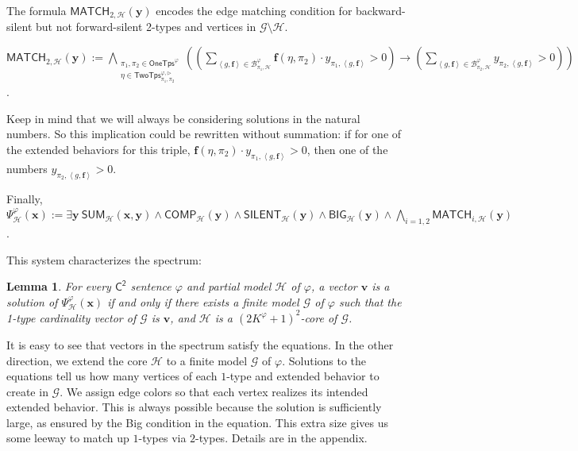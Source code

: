 \documentclass[10pt,a4paper]{article}
\newtheorem{lemma}[theorem]{Lemma}
\theoremstyle{definition}
\theoremstyle{remark}
\newcommand{\cB}{\mathcal{B}}
\newcommand{\cG}{\mathcal{G}}
\newcommand{\cH}{\mathcal{H}}
\newcommand{\cK}{\mathsf{TwoTps}}
\newcommand{\bff}{\mathbf{f}}
\newcommand{\bfv}{\mathbf{v}}
\newcommand{\bfx}{\mathbf{x}}
\newcommand{\bfy}{\mathbf{y}}
\newcommand{\Ctwo}    {\mathsf{C^2}}
\newcommand{\onetypes}{\mathsf{OneTps}}
\newcommand{\tuple}[1]       {\left\langle #1 \right\rangle}
\newcommand{\trif} {\triangleright}
\newcommand{\cKvpf}     {\cK^{\varphi, \trif}}
\newcommand{\summ}  {\mathsf{SUM}}
\newcommand{\comp}  {\mathsf{COMP}}
\newcommand{\silent}  {\mathsf{SILENT}}
\newcommand{\bige}  {\mathsf{BIG}}
\newcommand{\match} {\mathsf{MATCH}}
\begin{document}
\begin{compactitem}
    \item
        The formula $\match_{2, \cH}(\bfy)$ encodes the edge matching condition for backward-silent but not forward-silent 2-types and vertices in $\cG \setminus \cH$. \\
        \begin{notsotiny}
        $\displaystyle
        \match_{2, \cH}(\bfy)
         := 
        \bigwedge_{\substack{
            \pi_1, \pi_2 \in \onetypes^\varphi \\
            \eta \in \cKvpf_{\pi_1, \pi_2}}}
        \left(
            \left(
                \sum_{\tuple{g, \bff} \in \cB^{\varphi}_{\pi_1, \cH}} \bff(\eta, \pi_2) \cdot y_{\pi_1, \tuple{g, \bff}} > 0
            \right)
            \to
            \left(
                \sum_{\tuple{g, \bff} \in \cB^{\varphi}_{\pi_2, \cH}} y_{\pi_2, \tuple{g, \bff}} > 0
            \right)
        \right)
        $.
        \end{notsotiny}
        Keep in mind that we will always be considering solutions in the natural numbers. So this implication could be rewritten without summation: if for one of the extended behaviors for this triple, $\bff(\eta, \pi_2) \cdot y_{\pi_1, \tuple{g, \bff}} > 0$, then  one of the numbers $y_{\pi_2, \tuple{g, \bff}} > 0$.
\end{compactitem}
Finally, $\displaystyle
    \Psi^\varphi_{\cH}(\bfx)
         :=
         \exists \bfy\ 
        \summ_{\cH}(\bfx, \bfy) \land
        \comp_{\cH}(\bfy) \land
        \silent_{\cH}(\bfy) \land
        \bige_{\cH}(\bfy) \land
        \bigwedge_{i=1, 2}
        \match_{i, \cH}(\bfy)$.

This system characterizes the spectrum:
\begin{lemma}\label{lem:c2_spec_core}
    For every $\Ctwo$ sentence $\varphi$ and partial model $\cH$ of $\varphi$,
    a vector $\bfv$ is a solution of $\Psi^\varphi_\cH(\bfx)$
    if and only if
    there exists a finite model $\cG$ of $\varphi$ such that
    the 1-type cardinality vector of $\cG$ is $\bfv$,
    and $\cH$ is a $(2K^\varphi+1)^2$-core of $\cG$.
\end{lemma}

It is easy to see that vectors in the spectrum satisfy the equations. 
In the other direction, we extend the core $\cH$ to a finite model $\cG$ of $\varphi$.
Solutions to the equations tell us how many vertices of each $1$-type and extended behavior to create in $\cG$.
We assign edge colors so that each vertex realizes its intended extended behavior.
This is always possible because the solution is sufficiently large, as ensured by the Big condition in the equation. This extra size gives us some leeway to match up $1$-types via $2$-types.
Details are in the appendix.
\end{document}

